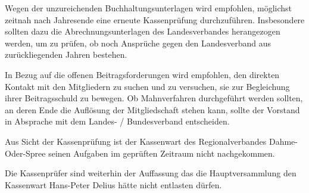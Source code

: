 \documentclass[%
	titlepage,oneside,12pt,headlines=1.5,numbers=noenddot, chapterprefix=false,parskip=full-,DIV=14,pagesize]{scrreprt}
\begin{document}
Wegen der unzureichenden Buchhaltungsunterlagen wird empfohlen, möglichst zeitnah nach Jahresende eine erneute Kassenprüfung durchzuführen. Insbesondere sollten dazu die Abrechnungsunterlagen des Landesverbandes herangezogen werden, um zu prüfen, ob noch Ansprüche gegen den Landesverband aus zurückliegenden Jahren bestehen.

In Bezug auf die offenen Beitragsforderungen wird empfohlen, den direkten Kontakt mit den Mitgliedern zu
suchen und zu versuchen, sie zur Begleichung ihrer Beitragsschuld zu bewegen. Ob Mahnverfahren durchgeführt werden sollten, an deren Ende die Auflösung der Mitgliedschaft stehen kann, sollte der Vorstand in Absprache mit dem Landes- / Bundesverband entscheiden.

Aus Sicht der Kassenprüfung ist der Kassenwart des Regionalverbandes Dahme-Oder-Spree seinen Aufgaben im geprüften
Zeitraum nicht nachgekommen.

Die Kassenprüfer sind weiterhin der Auffassung das die Hauptversammlung den Kassenwart Hans-Peter Delius hätte nicht entlasten dürfen.
\end{document}
